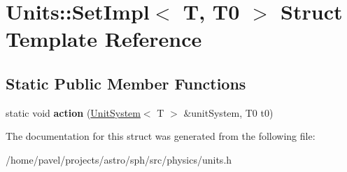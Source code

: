 \hypertarget{structUnits_1_1SetImpl_3_01T_00_01T0_01_4}{}\section{Units\+:\+:Set\+Impl$<$ T, T0 $>$ Struct Template Reference}
\label{structUnits_1_1SetImpl_3_01T_00_01T0_01_4}
\subsection*{Static Public Member Functions}
\begin{DoxyCompactItemize}
\item 
\hypertarget{structUnits_1_1SetImpl_3_01T_00_01T0_01_4_a0bffffebf683b61982ab15d5a3da8318}{}\label{structUnits_1_1SetImpl_3_01T_00_01T0_01_4_a0bffffebf683b61982ab15d5a3da8318} 
static void {\bfseries action} (\hyperlink{classUnitSystem}{Unit\+System}$<$ T $>$ \&unit\+System, T0 t0)
\end{DoxyCompactItemize}


The documentation for this struct was generated from the following file\+:\begin{DoxyCompactItemize}
\item 
/home/pavel/projects/astro/sph/src/physics/units.\+h\end{DoxyCompactItemize}
